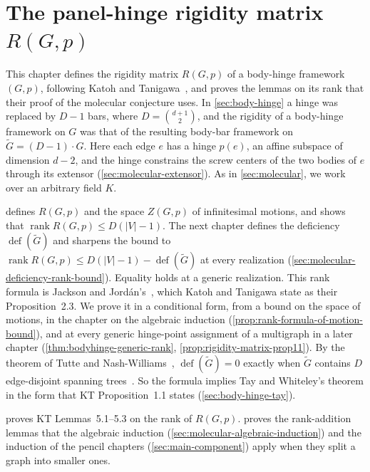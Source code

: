 \section{The panel-hinge rigidity matrix \texorpdfstring{$R(G,p)$}{R(G,p)}}
\label{sec:molecular-rigidity-matrix}

This chapter defines the rigidity matrix $R(G,p)$ of a body-hinge
framework $(G,p)$, following Katoh and
Tanigawa~\cite[\S\S2.2--2.4]{katohTanigawa2011}, and proves the lemmas
on its rank that their proof of the molecular conjecture uses. In
\cref{sec:body-hinge} a hinge was replaced by $D - 1$ bars, where
$D = \binom{d+1}{2}$, and the rigidity of a body-hinge framework on $G$
was that of the resulting body-bar framework on
$\tilde G = (D-1)\cdot G$. Here each edge $e$ has a hinge $p(e)$,
an affine subspace of dimension $d - 2$, and the hinge constrains the
screw centers of the two bodies of $e$ through its extensor
(\cref{sec:molecular-extensor}). As in \cref{sec:molecular}, we work
over an arbitrary field $K$.

 defines $R(G,p)$ and the space
$Z(G,p)$ of infinitesimal motions, and shows that
$\operatorname{rank} R(G,p) \le D(|V|-1)$. The next chapter defines the
deficiency $\operatorname{def}(\tilde G)$ and sharpens the bound to
$\operatorname{rank} R(G,p) \le D(|V|-1) - \operatorname{def}(\tilde G)$
at every realization (\cref{sec:molecular-deficiency-rank-bound}).
Equality holds at a generic realization. This rank formula is Jackson and
Jord\'an's~\cite[Theorem~6.1]{jacksonJordan2009}, which Katoh and
Tanigawa state as their Proposition~2.3. We prove it in a conditional
form, from a bound on the space of motions, in the chapter on the
algebraic induction (\cref{prop:rank-formula-of-motion-bound}), and at every
generic hinge-point assignment of a multigraph in a later chapter
(\cref{thm:bodyhinge-generic-rank}, \cref{prop:rigidity-matrix-prop11}). By the theorem
of Tutte and Nash-Williams~\cite{tutte1961,nashWilliams1961},
$\operatorname{def}(\tilde G) = 0$ exactly when $\tilde G$ contains $D$
edge-disjoint spanning trees~\cite[p.~655]{katohTanigawa2011}. So the
formula implies Tay and Whiteley's theorem in the form that KT
Proposition~1.1 states (\cref{sec:body-hinge-tay}).

 proves KT Lemmas~5.1--5.3 on
the rank of $R(G,p)$. 
proves the rank-addition lemmas that the algebraic induction
(\cref{sec:molecular-algebraic-induction}) and the induction of the
pencil chapters (\cref{sec:main-component}) apply when they split a
graph into smaller ones.


